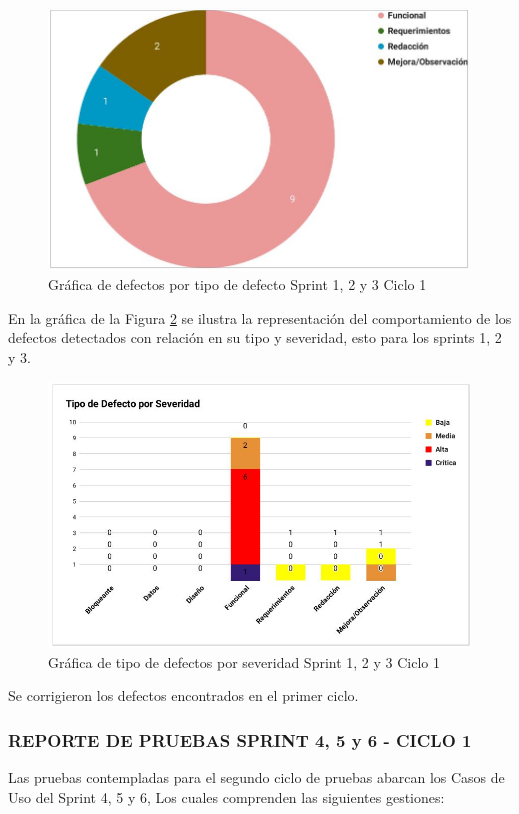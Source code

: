 \begin{figure}[H]
	\begin{center}
		\includegraphics[width=.65\textwidth]{images/pruebas/s1c1-2}
		\caption{Gráfica de defectos por tipo de defecto Sprint 1, 2 y 3 Ciclo 1}
		\label{fig:infos1c1-2}
	\end{center}
\end{figure}

\newpage

En la gráfica de la Figura \ref{fig:infos1c1-3} se ilustra la representación del comportamiento de los defectos detectados con relación en su tipo y severidad, esto para los sprints 1, 2 y 3.

\begin{figure}[H]
	\begin{center}
		\includegraphics[width=.95\textwidth]{images/pruebas/s1c1-3}
		\caption{Gráfica de tipo de defectos por severidad Sprint 1, 2 y 3 Ciclo 1}
		\label{fig:infos1c1-3}
	\end{center}
\end{figure}

Se corrigieron los defectos encontrados en el primer ciclo.
\newpage

\subsubsection{REPORTE DE PRUEBAS SPRINT 4, 5 y 6 - CICLO 1}
Las pruebas contempladas para el segundo ciclo de pruebas abarcan los Casos de Uso del Sprint 4, 5 y 6, Los cuales comprenden las siguientes gestiones:

